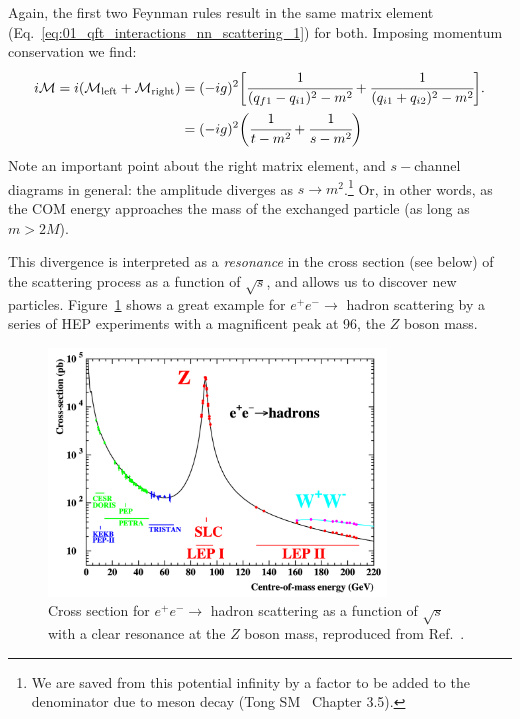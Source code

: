 

Again, the first two Feynman rules result in the same matrix element (Eq.~\ref{eq:01_qft_interactions_nn_scattering_1}) for both.
Imposing momentum conservation we find:
\begin{equation}
	\label{eq:01_qft_interactions_na_scattering}
	\begin{split}
		i \mathcal M = i(\mathcal M_{\mathrm{left}} + \mathcal M_{\mathrm{right}}) &= (-ig)^2 \bigg[ \cfrac{1}{(q_{f1} - q_{i1})^2 - m^2} + \cfrac{1}{(q_{i1} + q_{i2})^2 - m^2} \bigg]. \\
		&= (-ig)^2 \bigg( \cfrac{1}{t - m^2} + \cfrac{1}{s - m^2} \bigg)
	\end{split}
\end{equation}
Note an important point about the right matrix element, and $s-$channel diagrams in general: the amplitude diverges as $s \rightarrow m^2$.\footnote{We are saved from this potential infinity by a factor to be added to the denominator due to meson decay (Tong SM~\cite{TongSM} Chapter 3.5).}
Or, in other words, as the COM energy approaches the mass of the exchanged particle (as long as $m > 2M$).

This divergence is interpreted as a \textit{resonance} in the cross section (see below) of the scattering process as a function of $\sqrt{s}$, and allows us to discover new particles.
Figure~\ref{fig:01_qft_interactions_eezpeak} shows a great example for $e^+e^- \rightarrow$ hadron scattering by a series of HEP experiments with a magnificent peak at 96\GeV, the $Z$ boson mass.

\begin{figure}
	\centering
	\includegraphics[width=0.8\textwidth]{figures/01-SM-02-QFT/eezpeak}
	\caption{Cross section for $e^+e^- \rightarrow$ hadron scattering as a function of $\sqrt{s}$ with a clear resonance at the $Z$ boson mass, reproduced from Ref.~\cite{ALEPH:2005ab}.}
	\label{fig:01_qft_interactions_eezpeak}
\end{figure}


